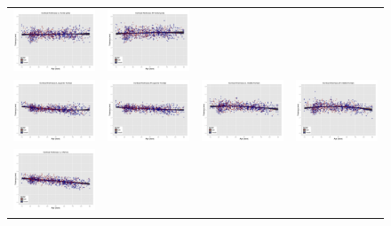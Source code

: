 \begin{figure}
\begin{tabular}{cccc}
  \includegraphics[width=35mm]{Figures/label15_results.pdf} &
  \includegraphics[width=35mm]{Figures/label16_results.pdf} \\
  \includegraphics[width=35mm]{Figures/label17_results.pdf} &
  \includegraphics[width=35mm]{Figures/label18_results.pdf} &
  \includegraphics[width=35mm]{Figures/label19_results.pdf} &
  \includegraphics[width=35mm]{Figures/label20_results.pdf} \\
  \includegraphics[width=35mm]{Figures/label21_results.pdf} &

\end{tabular}
\end{figure}
